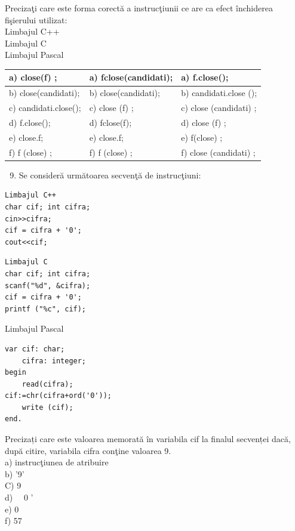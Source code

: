 \documentclass[10pt]{article}
\begin{document}
Precizaţi care este forma corectă a instrucţiunii ce are ca efect închiderea fişierului utilizat:\\
Limbajul C++\\
Limbajul C\\
Limbajul Pascal

\begin{center}
\begin{tabular}{|l|l|l|}
\hline
a) close(f) ; & a) fclose(candidati); & a) f.close(); \\
\hline
b) close(candidati); & b) close(candidati); & b) candidati.close (); \\
\hline
c) candidati.close(); & c) close (f) ; & c) close (candidati) ; \\
\hline
d) f.close(); & d) fclose(f); & d) close (f) ; \\
\hline
e) close.f; & e) close.f; & e) f(close) ; \\
\hline
f) f (close) ; & f) f (close) ; & f) close (candidati) ; \\
\hline
\end{tabular}
\end{center}

\begin{enumerate}
  \setcounter{enumi}{8}
  \item Se consideră următoarea secvenţă de instrucţiuni:
\end{enumerate}

\begin{verbatim}
Limbajul C++
char cif; int cifra;
cin>>cifra;
cif = cifra + '0';
cout<<cif;
\end{verbatim}

\begin{verbatim}
Limbajul C
char cif; int cifra;
scanf("%d", &cifra);
cif = cifra + '0';
printf ("%c", cif);
\end{verbatim}

Limbajul Pascal

\begin{verbatim}
var cif: char;
    cifra: integer;
begin
    read(cifra);
cif:=chr(cifra+ord('0'));
    write (cif);
end.
\end{verbatim}

Precizați care este valoarea memorată în variabila cif la finalul secvenței dacă, după citire, variabila cifra conţine valoarea 9.\\
a) instrucţiunea de atribuire\\
b) '9'\\
C) 9\\
d) $\quad 0$ '\\
e) 0\\
f) 57
\end{document}
